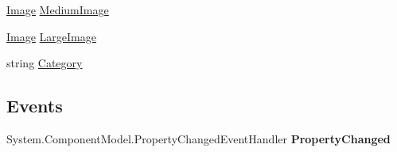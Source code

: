 \begin{DoxyCompactItemize}
\begin{DoxyCompactList}\small\item\em \end{DoxyCompactList}\item 
\hypertarget{class_amazon___price___finder_1_1amazon_1_1ecs_1_1_image_set_a6007a906c5f87fc29a5a63c6e7ffc38e}{\hyperlink{class_amazon___price___finder_1_1amazon_1_1ecs_1_1_image}{Image} \hyperlink{class_amazon___price___finder_1_1amazon_1_1ecs_1_1_image_set_a6007a906c5f87fc29a5a63c6e7ffc38e}{Medium\-Image}}\label{class_amazon___price___finder_1_1amazon_1_1ecs_1_1_image_set_a6007a906c5f87fc29a5a63c6e7ffc38e}

\begin{DoxyCompactList}\small\item\em \end{DoxyCompactList}\item 
\hypertarget{class_amazon___price___finder_1_1amazon_1_1ecs_1_1_image_set_adef93dad689b4e198376e43c1a300804}{\hyperlink{class_amazon___price___finder_1_1amazon_1_1ecs_1_1_image}{Image} \hyperlink{class_amazon___price___finder_1_1amazon_1_1ecs_1_1_image_set_adef93dad689b4e198376e43c1a300804}{Large\-Image}}\label{class_amazon___price___finder_1_1amazon_1_1ecs_1_1_image_set_adef93dad689b4e198376e43c1a300804}

\begin{DoxyCompactList}\small\item\em \end{DoxyCompactList}\item 
\hypertarget{class_amazon___price___finder_1_1amazon_1_1ecs_1_1_image_set_a21b151ae248172039e36e61dac2655d5}{string \hyperlink{class_amazon___price___finder_1_1amazon_1_1ecs_1_1_image_set_a21b151ae248172039e36e61dac2655d5}{Category}}\label{class_amazon___price___finder_1_1amazon_1_1ecs_1_1_image_set_a21b151ae248172039e36e61dac2655d5}

\begin{DoxyCompactList}\small\item\em \end{DoxyCompactList}\end{DoxyCompactItemize}
\subsection*{Events}
\begin{DoxyCompactItemize}
\item 
\hypertarget{class_amazon___price___finder_1_1amazon_1_1ecs_1_1_image_set_a6fa4531889f62696ed54c7d966b1e4e1}{System.\-Component\-Model.\-Property\-Changed\-Event\-Handler {\bfseries Property\-Changed}}\label{class_amazon___price___finder_1_1amazon_1_1ecs_1_1_image_set_a6fa4531889f62696ed54c7d966b1e4e1}

\end{DoxyCompactItemize}


